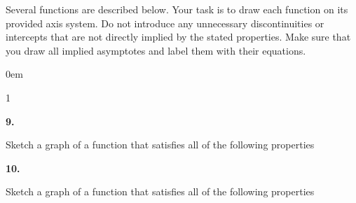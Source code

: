 \documentclass[12pt,]{book}
\theoremstyle{plain}
\theoremstyle{definition}
\numberwithin{equation}{section}
\newcounter{figstack}
\newcounter{figindex}
\newlength\fight
\newcommand\pushValignCaptionBottom[5][b]{%
\stepcounter{figstack}%
\expandafter\def\csname %
figalign\romannumeral\value{figstack}\endcsname{#1}%
\expandafter\def\csname %
figtype\romannumeral\value{figstack}\endcsname{#2}%
\expandafter\def\csname %
figwd\romannumeral\value{figstack}\endcsname{#3}%
\expandafter\def\csname %
figcontent\romannumeral\value{figstack}\endcsname{#4}%
\expandafter\def\csname %
figcap\romannumeral\value{figstack}\endcsname{#5}%
\setbox0=\hbox{%
\begin{#2}{#3}#4\end{#2}}%
\ifdim\dimexpr\ht0+\dp0\relax>\fight\global\setlength{\fight}{%
\dimexpr\ht0+\dp0\relax}\fi%
}
\newcommand\popValignCaptionBottom{%
\setcounter{figindex}{0}%
\hfill%
\whiledo{\value{figindex}<\value{figstack}}{%
\stepcounter{figindex}%
\def\tmp{\csname figwd\romannumeral\value{figindex}\endcsname}%
\begin{\csname figtype\romannumeral\value{figindex}\endcsname}[t]{\tmp}%
\centering%
\stackinset{c}{}%
{\csname figalign\romannumeral\value{figindex}\endcsname}{}%
{\csname figcontent\romannumeral\value{figindex}\endcsname}%
{\rule{0pt}{\fight}}\par%
\csname figcap\romannumeral\value{figindex}\endcsname%
\end{\csname figtype\romannumeral\value{figindex}\endcsname}%
\hfill%
}%
\setcounter{figstack}{0}%
\setlength{\fight}{0pt}%
\hfill%
}
\newenvironment{exercisegroup}%
{\medskip\noindent}%
{\par\bigskip}%
\newlength{\exercisegroupindent}%
\newlength{\exercisegroupitemwidth}%
\newenvironment{exercisegrouplist}%
{\vspace{-\partopsep}%
\begin{adjustwidth}{\exercisegroupindent}{0em}}%
{\end{adjustwidth}%
\vspace{-\partopsep}%
\vspace{\baselineskip}}%
\newenvironment{exercisegroupbycol}[1]%
{\begin{exercisegrouplist}%
\vspace{-\multicolsep}%
\begin{multicols}{#1}%
\setlength{\parindent}{0em}%
\setlength{\exercisegroupitemwidth}{\linewidth}}%
{\end{multicols}%
\vspace{-\multicolsep}%
\end{exercisegrouplist}}%
\newenvironment{exercisegroupitem}[1]%
{\begin{minipage}[t]{\exercisegroupitemwidth}
\vspace{0pt}%
{\bfseries#1}%
\rule{0pt}{\baselineskip}}{\strut%
\end{minipage}%
\hspace{\columnsep}}%
\providecommand\phantomsection{}
\newcommand{\fe}[2]{\mathop{{#1}{\left(#2\right)}}}
\begin{document}
\begin{exercisegroup}%
Several functions are described below. Your task is to draw each function on its provided axis system. Do not introduce any unnecessary discontinuities or intercepts that are not directly implied by the stated properties. Make sure that you draw all implied asymptotes and label them with their equations.%
\par
\begin{exercisegroupbycol}{1}%
\begin{exercisegroupitem}{9. }\phantomsection\hypertarget{exercise-120}{\null}
Sketch a graph of a function that satisfies all of the following properties%
\end{exercisegroupitem}%
\par%
\begin{exercisegroupitem}{10. }\phantomsection\hypertarget{exercise-121}{\null}
Sketch a graph of a function that satisfies all of the following properties%
\end{exercisegroupitem}
\end{exercisegroupbycol}
\end{exercisegroup}
\end{document}
